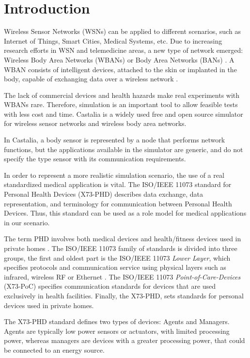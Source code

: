 \section{Introduction}

Wireless Sensor Networks (WSNs) can be applied to different scenarios, such as Internet of Things, Smart Cities, Medical Systems, etc. Due to increasing research efforts in WSN and telemedicine areas, a new type of network emerged: Wireless Body Area Networks (WBANs) or Body Area Networks (BANs) \cite{b21}. A WBAN consists of intelligent devices, attached to the skin or implanted in the body, capable of exchanging data over a wireless network \cite{b18}.

The lack of commercial devices and health hazards make real experiments with WBANs rare. Therefore, simulation is an important tool to allow feasible tests with less cost and time. Castalia \cite{b15} is a widely used free and open source simulator for wireless sensor networks and wireless body area networks. 

In Castalia, a body sensor is represented by a node that performs network functions, but the applications available in the simulator are generic, and do not specify the type sensor with its communication requirements. 

In order to represent a more realistic simulation scenario, the use of a real standardized medical application is vital. The ISO/IEEE 11073 standard for Personal Health Devices (X73-PHD) describes data exchange, data representation, and terminology for communication between Personal Health Devices. Thus, this standard can be used as a role model for medical applications in our scenario.

The term PHD involves both medical devices and health/fitness devices used in private homes \cite{b3}. The ISO/IEEE 11073 family of standards is divided into three groups, the first and oldest part is the ISO/IEEE 11073 \textit{Lower Layer}, which specifies protocols and communication service using physical layers such as infrared, wireless RF or Ethernet \cite{b16}. The ISO/IEEE 11073 \textit{Point-of-Care-Devices} (X73-PoC) specifies communication standards for devices that are used exclusively in health facilities. Finally, the X73-PHD, sets standards for personal devices used in private homes.

The X73-PHD standard defines two types of devices: Agents and Managers. Agents are typically low power sensors or actuators, with limited processing power, whereas managers are devices with a greater processing power, that could be connected to an energy source.

